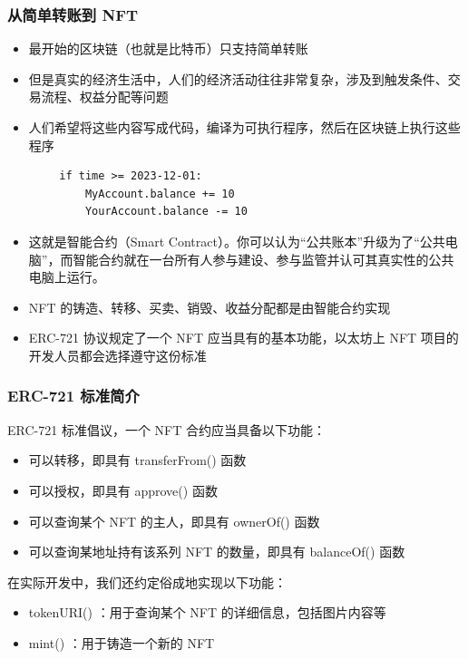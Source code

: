 \documentclass{beamer}
\begin{document}
\begin{frame}[fragile]
    \frametitle{从简单转账到 NFT}

    \begin{itemize}
        \item 最开始的区块链（也就是比特币）只支持简单转账
        \item 但是真实的经济生活中，人们的经济活动往往非常复杂，涉及到触发条件、交易流程、权益分配等问题
        \item 人们希望将这些内容写成代码，编译为可执行程序，然后在区块链上执行这些程序
        
    \end{itemize}

    \begin{lstlisting}
        if time >= 2023-12-01:
            MyAccount.balance += 10
            YourAccount.balance -= 10
    \end{lstlisting}
  
    \begin{itemize}
        \item 这就是智能合约（Smart Contract）。你可以认为“公共账本”升级为了“公共电脑”，而智能合约就在一台所有人参与建设、参与监管并认可其真实性的公共电脑上运行。
        \item NFT 的铸造、转移、买卖、销毁、收益分配都是由智能合约实现
        \item ERC-721 协议规定了一个 NFT 应当具有的基本功能，以太坊上 NFT 项目的开发人员都会选择遵守这份标准
    \end{itemize}

\end{frame}

\begin{frame}
    \frametitle{ERC-721 标准简介}

    ERC-721 标准倡议，一个 NFT 合约应当具备以下功能：

    \begin{itemize}
        \item 可以转移，即具有 transferFrom() 函数
        \item 可以授权，即具有 approve() 函数
        \item 可以查询某个 NFT 的主人，即具有 ownerOf() 函数
        \item 可以查询某地址持有该系列 NFT 的数量，即具有 balanceOf() 函数
    \end{itemize}

    在实际开发中，我们还约定俗成地实现以下功能：

    \begin{itemize}
        \item tokenURI() ：用于查询某个 NFT 的详细信息，包括图片内容等
        \item mint() ：用于铸造一个新的 NFT 
    \end{itemize}

\end{frame}
\end{document}
